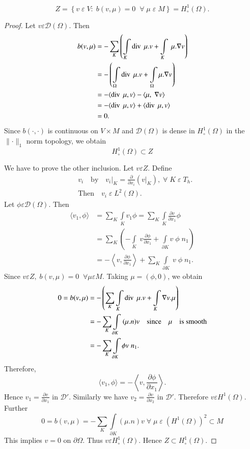 \setcounter{lem}{4}
\begin{lem}\label{chap7:lem5}
$$
Z=\left\{v\;\varepsilon \;V:\;b(v,\mu)=0\; \; \forall \;\mu \;\varepsilon
\;M\right\}= H_\circ^1(\Omega).
$$
\end{lem}\pageoriginale 
\begin{proof}
Let $v\varepsilon\mathscr{D}(\Omega)$. Then 
\begin{align*}
b(v,\mu) &= -\sum\limits_K\left(\int\limits_K\operatorname{div} \;\mu.v+
\int\limits_K \;\mu.\nabla v\right)\\
&= -\left(\int\limits_\Omega\operatorname{div} \;\mu.v+\int\limits_\Omega\mu. \nabla
v\right)\\
&= -\langle\operatorname{div}\;\mu,v\rangle-\langle\mu,\;\nabla v\rangle\\
&= -\langle\operatorname{div}\;\mu,v\rangle+\langle\operatorname{div} \;\mu,v\rangle\\
&= 0.
\end{align*}
Since $b(\cdotp,\cdotp)$ is continuous on $V\times M$ and
$\mathscr{D}(\Omega)$ is dense in $H_\circ^1(\Omega)$ in the
$\parallel\cdotp\parallel_1$ norm topology, we obtain 
$$
H_\circ^1(\Omega)\subset Z
$$

We have to prove the other inclusion. Let $v\varepsilon Z$. Define 
\begin{align*}
&v_i\quad\text{by}\quad v_i|_K=\frac{\partial}{\partial x_i} (v|_K),
\;\forall \;K\;\varepsilon \;T_h.\\
&\text{Then}\quad v_i\;\varepsilon\;L^2(\Omega).
\end{align*}
Let $\phi \varepsilon\mathscr{D}(\Omega)$. Then 
\begin{align*}
\langle v_1,\phi\rangle &= \sum\limits_K\int\limits_Kv_1\phi=\sum\limits_K
\int\limits_K\frac{\partial v}{\partial x_1}\phi\\
&= \sum\limits_K\left(-\int\limits_K\;v\frac{\partial\phi} {\partial
x_1}+\int\limits_{\partial K}v\;\phi \;n_1\right)\\
&= -\left\langle v,\frac{\partial\phi}{\partial x_1}\right\rangle+\sum\limits_K
\int\limits_{\partial K}\;v\;\phi \;n_1.
\end{align*}\pageoriginale
Since $v\varepsilon Z,\;b(v,\mu)=0 \;\; \forall\mu\varepsilon M$. Taking
$\mu=(\phi,0)$, we obtain 
\begin{align*}
0=b(v,\mu) &= -\left(\sum\limits_K\int\limits_K\operatorname{div} \;\mu.v+
\int\limits_K\nabla v.\mu\right)\\
&= -\sum\limits_K\int\limits_{\partial K}\;(\mu.n)v\quad\text{since}
\quad\mu\quad\text{is smooth}\\
&= -\sum\limits_K\int\limits_{\partial K}\phi v\;n_1.
\end{align*}
Therefore,
$$
\langle v_1,\phi \rangle=-\left\langle 
v,\frac{\partial\phi}{\partial x_1}\right\rangle.
$$
Hence $v_1=\frac{\partial v}{\partial x_1}$ in
$\mathscr{D}'$. Similarly we have $v_2=\frac{\partial v} {\partial
x_2}$ in $\mathscr{D}'$. Therefore $v\varepsilon H^1(\Omega)$. Further
$$
0=b(v,\mu)=-\sum\limits_K\int\limits_{\partial K}(\mu.n)v\;\forall
\;\mu \;\varepsilon \;(H^1(\Omega))^2\subset M
$$
This implies $v=0$ on $\partial\Omega$. Thus $v\varepsilon
H_\circ^1(\Omega)$. Hence $Z\subset H_\circ^1(\Omega)$. 


\end{proof}
